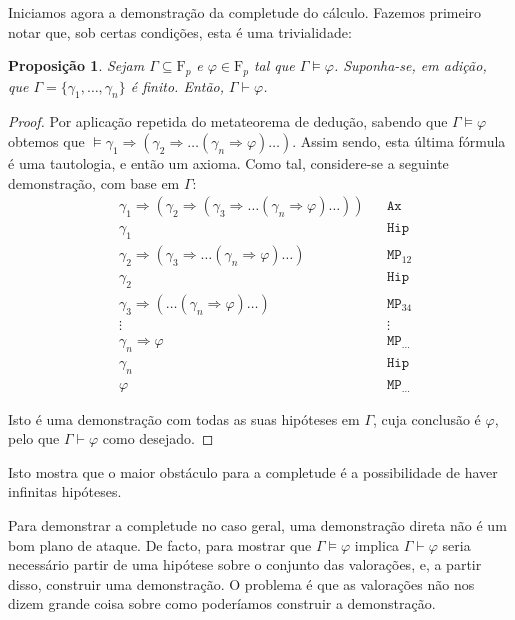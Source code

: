 \documentclass{report}
\newtheorem{prop}{Proposição}
\theoremstyle{definition}
\theoremstyle{remark}
\newcommand{\F}{\mathrm{F}}
\newcommand{\imply}{\mathbin{\Rightarrow}}
\begin{document}
	Iniciamos agora a demonstração da completude do cálculo. Fazemos primeiro notar que, sob certas condições, esta é uma trivialidade:
	
	\begin{prop}
	Sejam $\Gamma \subseteq \F_p$ e $\varphi \in \F_p$ tal que $\Gamma \vDash \varphi$. Suponha-se, em adição, que $\Gamma = \{\gamma_1, \dots, \gamma_n\}$ é finito. Então, $\Gamma \vdash \varphi$.
	\end{prop}
	
	\begin{proof}
	Por aplicação repetida do metateorema de dedução, sabendo que $\Gamma \vDash \varphi$ obtemos que $\vDash \gamma_1 \imply (\gamma_2 \imply \dots (\gamma_n \imply \varphi) \dots )$. Assim sendo, esta última fórmula é uma tautologia, e então um axioma. Como tal, considere-se a seguinte demonstração, com base em $\Gamma$:
	\begin{align*}
	&\gamma_1 \imply (\gamma_2 \imply (\gamma_3 \imply \dots (\gamma_n \imply \varphi) \dots )) &&\texttt{Ax}\\
	&\gamma_1 &&\texttt{Hip}\\
	&\gamma_2 \imply (\gamma_3 \imply \dots (\gamma_n \imply \varphi) \dots ) &&\texttt{MP}_{12}\\
	&\gamma_2 &&\texttt{Hip}\\
	&\gamma_3 \imply ( \dots (\gamma_n \imply \varphi) \dots)  &&\texttt{MP}_{34}\\
	&\vdots&&\vdots\\
	&\gamma_n \imply \varphi &&\texttt{MP}_{\dots}\\
	&\gamma_n &&\texttt{Hip}\\
	&\varphi &&\texttt{MP}_{\dots}
	\end{align*}
	
	Isto é uma demonstração com todas as suas hipóteses em $\Gamma$, cuja conclusão é $\varphi$, pelo que $\Gamma \vdash \varphi$ como desejado.
	\end{proof}
	
	Isto mostra que o maior obstáculo para a completude é a possibilidade de haver infinitas hipóteses.
	
	Para demonstrar a completude no caso geral, uma demonstração direta não é um bom plano de ataque. De facto, para mostrar que $\Gamma \vDash \varphi$ implica $\Gamma \vdash \varphi$ seria necessário partir de uma hipótese sobre o conjunto das valorações, e, a partir disso, construir uma demonstração. O problema é que as valorações não nos dizem grande coisa sobre como poderíamos construir a demonstração.
	
\end{document}
